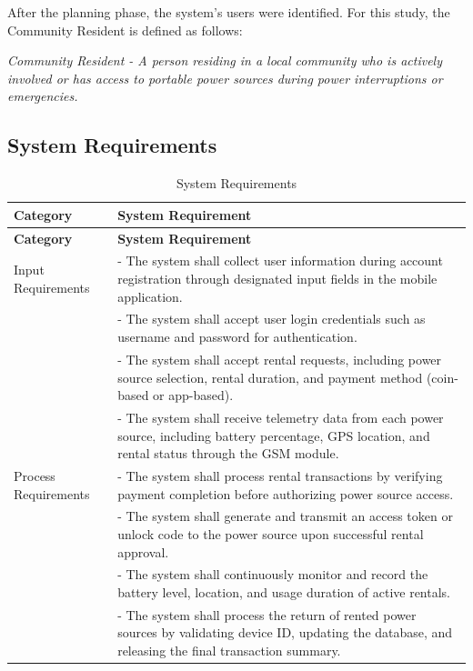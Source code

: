 {After the planning phase, the system’s users were identified. For this study, the Community Resident is defined as follows:

\textit{Community Resident - A person residing in a local community who is actively involved or has access to portable power sources during power interruptions or emergencies.}

\subsection{System Requirements}

\begin{longtable}{p{4cm} p{9cm}}
	\caption{System Requirements} \label{tab:SystemRequirements} \\
	\toprule
	\textbf{Category} & \textbf{System Requirement} \\
	\midrule
	\endfirsthead
	
	\toprule
	\textbf{Category} & \textbf{System Requirement} \\
	\midrule
	\endhead
	
	\bottomrule
	\endfoot
	
	Input Requirements & - The system shall collect user information during account registration through designated input fields in the mobile application. \\
	& - The system shall accept user login credentials such as username and password for authentication. \\
	& - The system shall accept rental requests, including power source selection, rental duration, and payment method (coin-based or app-based).\\
	& - The system shall receive telemetry data from each power source, including battery percentage, GPS location, and rental status through the GSM module. \\
	\midrule
	
	Process Requirements & - The system shall process rental transactions by verifying payment completion before authorizing power source access. \\
	& - The system shall generate and transmit an access token or unlock code to the power source upon successful rental approval. \\
	& - The system shall continuously monitor and record the battery level, location, and usage duration of active rentals. \\
	& - The system shall process the return of rented power sources by validating device ID, updating the database, and releasing the final transaction summary. \\
	\midrule
	

\end{longtable}}
